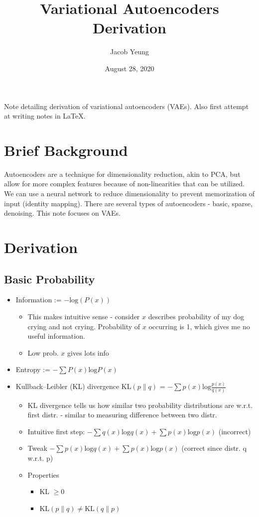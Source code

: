 \documentclass{article}
\title{Variational Autoencoders Derivation}
\author{Jacob Yeung}
\date{August 28, 2020}
\begin{document}
\maketitle

Note detailing derivation of variational autoencoders (VAEs). Also first attempt at writing notes in LaTeX.

\section{Brief Background}
Autoencoders are a technique for dimensionality reduction, akin to PCA, but allow for more complex features because of non-linearities that can be utilized. We can use a neural network to reduce dimensionality to prevent memorization of input (identity mapping). There are several types of autoencoders - basic, sparse, denoising. This note focuses on VAEs.

\section{Derivation}
\subsection{Basic Probability}
\begin{itemize}
    \item Information := $-\text{log}(P(x))$
    \begin{itemize}
        \item This makes intuitive sense - consider $x$ describes probability of my dog crying and not crying. Probability of $x$ occurring is 1, which gives me no useful information.
        \item Low prob. $x$ gives lots info
    \end{itemize}
    \item Entropy := $-\sum P(x)\text{log}P(x)$
    \item Kullback–Leibler (KL) divergence KL$(p\parallel q)$ = $-\sum p(x)\text{log}\frac{p(x)}{q(x)}$
    \begin{itemize}
        \item KL divergence tells us how similar two probability distributions are w.r.t. first distr. - similar to measuring difference between two distr.
        \item Intuitive first step: $-\sum q(x)\text{log}q(x) + \sum p(x)\text{log}p(x)$ (incorrect)
        \item Tweak $-\sum p(x)\text{log}q(x) + \sum p(x)\text{log}p(x)$ (correct since distr. q w.r.t. p)
        \item Properties
        \begin{itemize}
            \item KL $\geq 0$
            \item KL$(p\parallel q) \ne \text{KL}(q\parallel p)$
        \end{itemize}
    \end{itemize}
\end{itemize}
\end{document}
